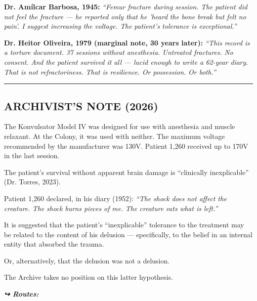 \noindent \textbf{Dr. Amílcar Barbosa, 1945:}
\textit{\textquotedblleft{}Femur fracture during session. The patient did not feel the fracture --- he reported only that he 'heard the bone break but felt no pain'. I suggest increasing the voltage. The patient's tolerance is exceptional.\textquotedblright{}}

\noindent \textbf{Dr. Heitor Oliveira, 1979 (marginal note, 30 years later):}
\textit{\textquotedblleft{}This record is a torture document. 37 sessions without anesthesia. Untreated fractures. No consent. And the patient survived it all --- lucid enough to write a 62-year diary. That is not refractoriness. That is resilience. Or possession. Or both.\textquotedblright{}}

\vspace{0.5em}\noindent\rule{\textwidth}{0.5pt}\vspace{0.5em}

\subsection*{ARCHIVIST'S NOTE (2026)}

\noindent The Konvulsator Model IV was designed for use with anesthesia and muscle relaxant. At the Colony, it was used with neither. The maximum voltage recommended by the manufacturer was 130V. Patient 1,260 received up to 170V in the last session.

\noindent The patient's survival without apparent brain damage is \textquotedblleft{}clinically inexplicable\textquotedblright{} (Dr. Torres, 2023).

\noindent Patient 1,260 declared, in his diary (1952): \textit{\textquotedblleft{}The shock does not affect the creature. The shock burns pieces of me. The creature eats what is left.\textquotedblright{}}

\noindent It is suggested that the patient's \textquotedblleft{}inexplicable\textquotedblright{} tolerance to the treatment may be related to the content of his delusion --- specifically, to the belief in an internal entity that absorbed the trauma.

\noindent Or, alternatively, that the delusion was not a delusion.

\noindent The Archive takes no position on this latter hypothesis.

\vspace{0.5em}
\noindent\textit{\textbf{↪ Routes:}  \rotasep {} \rotasep {}}
